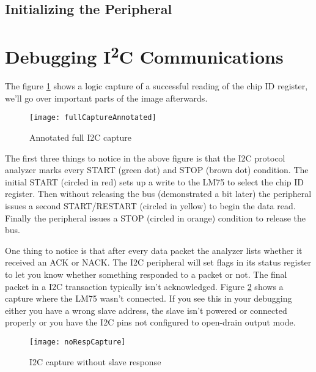 \documentclass[11pt,fleqn]{book} %
\begin{document}
\subsection{Initializing the Peripheral}

\subsection{}

\section{Debugging I\textsuperscript{2}C Communications}

The figure \ref{fullCaptureAnnotated} shows a logic capture of a successful reading of the chip ID register, we'll go over important parts of the image afterwards. 

\begin{figure}[]
    \centering\texttt{[image: fullCaptureAnnotated]}
    \caption{Annotated full I2C capture}
    \label{fullCaptureAnnotated}
\end{figure}

The first three things to notice in the above figure is that the I2C protocol analyzer marks every START (green dot) and STOP (brown dot) condition. The initial START (circled in red) sets up a write to the LM75 to select the chip ID register. Then without releasing the bus (demonstrated a bit later) the peripheral issues a second START/RESTART (circled in yellow) to begin the data read. Finally the peripheral issues a STOP (circled in orange) condition to release the bus.  

One thing to notice is that after every data packet the analyzer lists whether it received an ACK or NACK. The I2C peripheral will set flags in its status register to let you know whether something responded to a packet or not. The final packet in a I2C transaction typically isn't acknowledged. Figure \ref{noRespCapture} shows a capture where the LM75 wasn't connected. If you see this in your debugging either you have a wrong slave address, the slave isn't powered or connected properly or you have the I2C pins not configured to open-drain output mode. 

\begin{figure}[]
    \centering\texttt{[image: noRespCapture]}
    \caption{I2C capture without slave response}
    \label{noRespCapture}
\end{figure}
\end{document}
